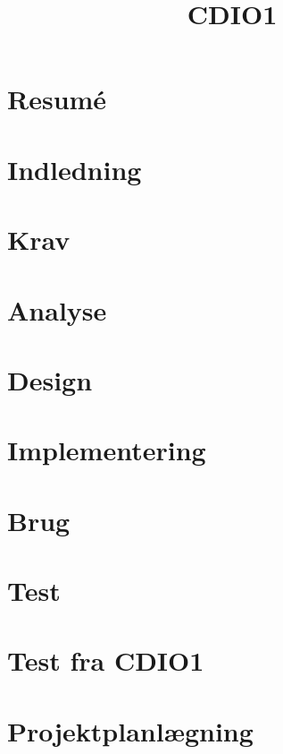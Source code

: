 \documentclass[12pt,oneside,a4paper,english]{article}
\title{CDIO1} %
\begin{document}


\newpage
\doublespacing
\renewcommand{\baselinestretch}{1}\normalsize
\tableofcontents
\renewcommand{\baselinestretch}{1}\normalsize
\thispagestyle{fancy} %

\newpage
{} 


\section{Resumé} \label{resume}

\section{Indledning} \label{introduction}
 
\newpage
\section{Krav} \label{demands}

\section{Analyse} \label{analysis}

\section{Design} \label{design}

\newpage
\section{Implementering} \label{implementation}

\newpage
\section{Brug} \label{brug}

\section{Test} \label{test}

\newpage
\section{Test fra CDIO1} \label{test1}

\section{Projektplanlægning} \label{projectplan}

\end{document}
